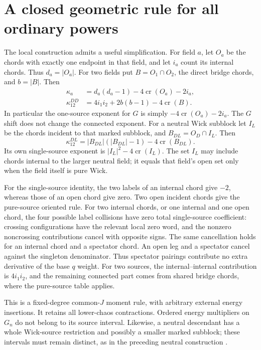 \documentclass[11pt]{article}
\newcommand{\crs}{\operatorname{cr}}
\begin{document}
\section{A closed geometric rule for all ordinary powers}
The local construction admits a useful simplification. For field $a$,
let $O_a$ be the chords with exactly one endpoint in that field, and
let $i_a$ count its internal chords. Thus $d_a=|O_a|$. For two fields
put $B=O_1\cap O_2$, the direct bridge chords, and $b=|B|$. Then
\begin{align}
 \kappa_a&=d_a(d_a-1)-4\crs(O_a)-2i_a,\\
 \kappa_{12}^{DD}&=4i_1i_2+2b(b-1)-4\crs(B).\label{eq:closed}
\end{align}
In particular the one-source exponent for $G$ is simply
$-4\crs(O_a)-2i_a$. The $G$ shift does not change the connected
exponent. For a neutral Wick subblock let $I_L$ be the chords incident
to that marked subblock, and $B_{DL}=O_D\cap I_L$. Then
\begin{equation}
 \kappa_{12}^{DL}=|B_{DL}|(|B_{DL}|-1)-4\crs(B_{DL}).
\end{equation}
Its own single-source exponent is $|I_L|^2-4\crs(I_L)$.
The set $I_L$ may include chords internal to the larger neutral field;
it equals that field's open set only when the field itself is pure Wick.

For the single-source identity, the two labels of an internal chord
give $-2$, whereas those of an open chord give zero. Two open
incident chords give the pure-source oriented rule. For two internal
chords, or one internal and one open chord, the four possible label
collisions have zero total single-source coefficient: crossing
configurations have the relevant local zero word, and the nonzero
noncrossing contributions cancel with opposite signs. The same
cancellation holds for an internal chord and a spectator chord.
An open leg and a spectator cancel against the singleton denominator.
Thus spectator pairings contribute no extra derivative of the base
$q$ weight. For two sources, the internal--internal contribution is
$4i_1i_2$, and the remaining connected part comes from shared bridge
chords, where the pure-source table applies.

This is a fixed-degree common-$J$ moment rule, with arbitrary external
energy insertions. It retains all lower-chaos contractions. Ordered
energy multipliers on $G_n$ do not belong to its source interval.
Likewise, a neutral descendant has a whole Wick-source restriction
and possibly a smaller marked subblock; these intervals must remain
distinct, as in the preceding neutral construction \cite{Neutral}.
\end{document}
